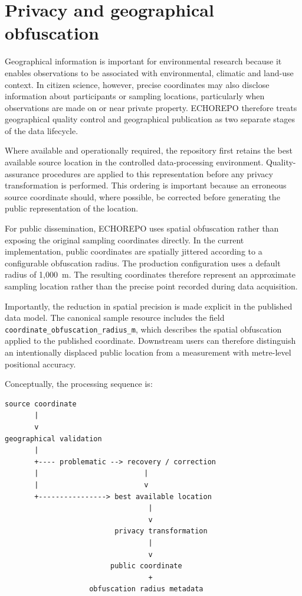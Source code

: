 \section{Privacy and geographical obfuscation}

Geographical information is important for environmental research because it enables observations to be associated with environmental, climatic and land-use context. In citizen science, however, precise coordinates may also disclose information about participants or sampling locations, particularly when observations are made on or near private property. ECHOREPO therefore treats geographical quality control and geographical publication as two separate stages of the data lifecycle.

Where available and operationally required, the repository first retains the best available source location in the controlled data-processing environment. Quality-assurance procedures are applied to this representation before any privacy transformation is performed. This ordering is important because an erroneous source coordinate should, where possible, be corrected before generating the public representation of the location.

For public dissemination, ECHOREPO uses spatial obfuscation rather than exposing the original sampling coordinates directly. In the current implementation, public coordinates are spatially jittered according to a configurable obfuscation radius. The production configuration uses a default radius of 1,000~m. The resulting coordinates therefore represent an approximate sampling location rather than the precise point recorded during data acquisition.

Importantly, the reduction in spatial precision is made explicit in the published data model. The canonical sample resource includes the field
\texttt{coordinate\_obfuscation\_radius\_m}, which describes the spatial obfuscation applied to the published coordinate. Downstream users can therefore distinguish an intentionally displaced public location from a measurement with metre-level positional accuracy.

Conceptually, the processing sequence is:

\begin{verbatim}
source coordinate
       |
       v
geographical validation
       |
       +---- problematic --> recovery / correction
       |                         |
       |                         v
       +----------------> best available location
                                  |
                                  v
                          privacy transformation
                                  |
                                  v
                         public coordinate
                                  +
                    obfuscation radius metadata
\end{verbatim}

